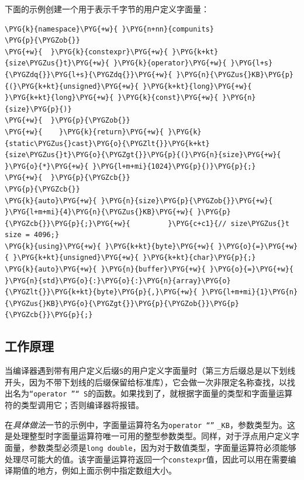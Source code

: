 
下面的示例创建一个用于表示千字节的用户定义字面量：



\begin{codeblockbg}
\begin{Verbatim}[commandchars=\\\{\},breaklines=true,breakanywhere=true,fontsize=\codefont,xleftmargin=17bp]
\PYG{k}{namespace}\PYG{+w}{ }\PYG{n+nn}{compunits}
\PYG{p}{\PYGZob{}}
\PYG{+w}{  }\PYG{k}{constexpr}\PYG{+w}{ }\PYG{k+kt}{size\PYGZus{}t}\PYG{+w}{ }\PYG{k}{operator}\PYG{+w}{ }\PYG{l+s}{\PYGZdq{}}\PYG{l+s}{\PYGZdq{}}\PYG{+w}{ }\PYG{n}{\PYGZus{}KB}\PYG{p}{(}\PYG{k+kt}{unsigned}\PYG{+w}{ }\PYG{k+kt}{long}\PYG{+w}{ }\PYG{k+kt}{long}\PYG{+w}{ }\PYG{k}{const}\PYG{+w}{ }\PYG{n}{size}\PYG{p}{)}
\PYG{+w}{  }\PYG{p}{\PYGZob{}}
\PYG{+w}{    }\PYG{k}{return}\PYG{+w}{ }\PYG{k}{static\PYGZus{}cast}\PYG{o}{\PYGZlt{}}\PYG{k+kt}{size\PYGZus{}t}\PYG{o}{\PYGZgt{}}\PYG{p}{(}\PYG{n}{size}\PYG{+w}{ }\PYG{o}{*}\PYG{+w}{ }\PYG{l+m+mi}{1024}\PYG{p}{)}\PYG{p}{;}
\PYG{+w}{  }\PYG{p}{\PYGZcb{}}
\PYG{p}{\PYGZcb{}}
\PYG{k}{auto}\PYG{+w}{ }\PYG{n}{size}\PYG{p}{\PYGZob{}}\PYG{+w}{ }\PYG{l+m+mi}{4}\PYG{n}{\PYGZus{}KB}\PYG{+w}{ }\PYG{p}{\PYGZcb{}}\PYG{p}{;}\PYG{+w}{         }\PYG{c+c1}{// size\PYGZus{}t size = 4096;}
\PYG{k}{using}\PYG{+w}{ }\PYG{k+kt}{byte}\PYG{+w}{ }\PYG{o}{=}\PYG{+w}{ }\PYG{k+kt}{unsigned}\PYG{+w}{ }\PYG{k+kt}{char}\PYG{p}{;}
\PYG{k}{auto}\PYG{+w}{ }\PYG{n}{buffer}\PYG{+w}{ }\PYG{o}{=}\PYG{+w}{ }\PYG{n}{std}\PYG{o}{:}\PYG{o}{:}\PYG{n}{array}\PYG{o}{\PYGZlt{}}\PYG{k+kt}{byte}\PYG{p}{,}\PYG{+w}{ }\PYG{l+m+mi}{1}\PYG{n}{\PYGZus{}KB}\PYG{o}{\PYGZgt{}}\PYG{p}{\PYGZob{}}\PYG{p}{\PYGZcb{}}\PYG{p}{;}
\end{Verbatim}
\end{codeblockbg}



\subsection{工作原理}



当编译器遇到带有用户定义后缀\texttt{S}的用户定义字面量时（第三方后缀总是以下划线开头，因为不带下划线的后缀保留给标准库），它会做一次非限定名称查找，以找出名为\texttt{“operator ”“ S}的函数。如果找到了，就根据字面量的类型和字面量运算符的类型调用它；否则编译器将报错。



在\textit{具体做法}一节的示例中，字面量运算符名为\texttt{operator “”} \texttt{\_\allowbreak{}KB}，参数类型为。这是处理整型时字面量运算符唯一可用的整型参数类型。同样，对于浮点用户定义字面量，参数类型必须是\texttt{long double}，因为对于数值类型，字面量运算符必须能够处理尽可能大的值。该字面量运算符返回一个\texttt{constexpr}值，因此可以用在需要编译期值的地方，例如上面示例中指定数组大小。


